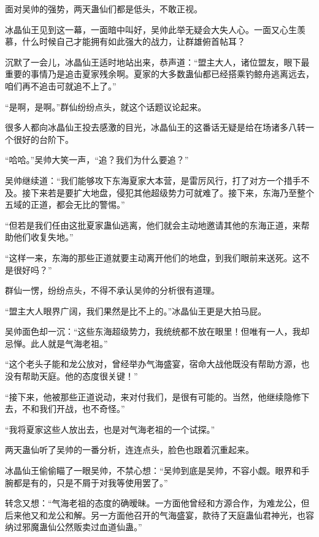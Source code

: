 
\begin{this_body}

面对吴帅的强势，两天蛊仙们都是低头，不敢正视。

冰晶仙王见到这一幕，一面暗中叫好，吴帅此举无疑会大失人心。一面又心生羡慕，什么时候自己才能拥有如此强大的战力，让群雄俯首帖耳？

沉默了一会儿，冰晶仙王适时地站出来，恭声道：“盟主大人，诸位盟友，眼下最重要的事情乃是追击夏家残余啊。夏家的大多数蛊仙都已经搭乘钓鲸舟逃离远去，咱们再不追击可就追不上了。”

“是啊，是啊。”群仙纷纷点头，就这个话题议论起来。

很多人都向冰晶仙王投去感激的目光，冰晶仙王的这番话无疑是给在场诸多八转一个很好的台阶下。

“哈哈。”吴帅大笑一声，“追？我们为什么要追？”

吴帅继续道：“我们能够攻下东海夏家大本营，是雷厉风行，打了对方一个措手不及。接下来若是要扩大地盘，侵犯其他超级势力可就难了。接下来，东海乃至整个五域的正道，都会无比的警惕。”

“但若是我们任由这批夏家蛊仙逃离，他们就会主动地邀请其他的东海正道，来帮助他们收复失地。”

“这样一来，东海的那些正道就要主动离开他们的地盘，到我们眼前来送死。这不是很好吗？”

群仙一愣，纷纷点头，不得不承认吴帅的分析很有道理。

“盟主大人眼界广阔，我们果然是比不上的。”冰晶仙王更是大拍马屁。

吴帅面色却一沉：“这些东海超级势力，我统统都不放在眼里！但唯有一人，我却忌惮。此人就是气海老祖。”

“这个老头子能和龙公放对，曾经举办气海盛宴，宿命大战他既没有帮助方源，也没有帮助天庭。他的态度很关键！”

“接下来，他被那些正道说动，来对付我们，是很有可能的。当然，他继续隐修下去，不和我们开战，也不奇怪。”

“我将夏家这些人放出去，也是对气海老祖的一个试探。”

两天蛊仙听了吴帅的一番分析，连连点头，脸色也跟着沉重起来。

冰晶仙王偷偷瞄了一眼吴帅，不禁心想：“吴帅到底是吴帅，不容小觑。眼界和手腕都是有的，只是不屑于对我等使用罢了。”

转念又想：“气海老祖的态度的确暧昧。一方面他曾经和方源合作，为难龙公，但后来他又和龙公和解。另一方面他召开的气海盛宴，款待了天庭蛊仙君神光，也容纳过邪魔蛊仙公然贩卖过血道仙蛊。”


\end{this_body}
